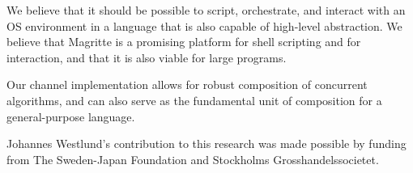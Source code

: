 \documentclass[english,PRO]{ipsj}
\begin{document}
\noindent
We believe that it should be possible to script, orchestrate, and interact with an OS environment in a language that is also capable of high-level abstraction. We believe that Magritte is a promising platform for shell scripting and for interaction, and that it is also viable for large programs.

Our channel implementation allows for robust composition of concurrent algorithms, and can also serve as the fundamental unit of composition for a general-purpose language.

\begin{acknowledgment}
Johannes Westlund's contribution to this research was made possible by funding from The Sweden-Japan Foundation and Stockholms Grosshandelssocietet.
\end{acknowledgment}



\end{document}
